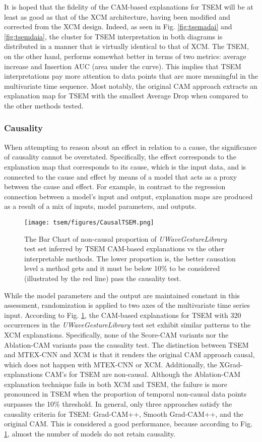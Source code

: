 \documentclass{svproc}
\begin{document}
It is hoped that the fidelity of the CAM-based explanations for TSEM will be at least as good as that of the XCM architecture, having been modified and corrected from the XCM design. Indeed, as seen in Fig. \ref{fig:tsemadai} and \ref{fig:tsemdaia}, the cluster for TSEM interpretation in both diagrams is distributed in a manner that is virtually identical to that of XCM. The TSEM, on the other hand, performs somewhat better in terms of two metrics: average increase and Insertion AUC (area under the curve). This implies that TSEM interpretations pay more attention to data points that are more meaningful in the multivariate time sequence. Most notably, the original CAM approach extracts an explanation map for TSEM with the smallest Average Drop when compared to the other methods tested.

\subsubsection{Causality}

When attempting to reason about an effect in relation to a cause, the significance of causality cannot be overstated. Specifically, the effect corresponds to the explanation map that corresponds to its cause, which is the input data, and is connected to the cause and effect by means of a model that acts as a proxy between the cause and effect. For example, in contrast to the regression connection between a model's input and output, explanation maps are produced as a result of a mix of inputs, model parameters, and outputs.
\begin{figure}[h!]
\centering
\texttt{[image: tsem/figures/CausalTSEM.png]}
\caption{The Bar Chart of non-causal proportion of \textit{UWaveGestureLibrary} test set inferred by TSEM CAM-based explanations vs the other interpretable methods. The lower proportion is, the better causation level a method gets and it must be below 10\% to be considered (illustrated by the red line) pass the causality test.}
\label{fig:causality}
\end{figure}

While the model parameters and the output are maintained constant in this assessment, randomization is applied to two axes of the multivariate time series input. According to Fig. \ref{fig:causality}, the CAM-based explanations for TSEM with 320 occurrences in the \textit{UWaveGestureLibrary} test set exhibit similar patterns to the XCM explanations. Specifically, none of the Score-CAM variants nor the Ablation-CAM variants pass the causality test. The distinction between TSEM and MTEX-CNN and XCM is that it renders the original CAM approach causal, which does not happen with MTEX-CNN or XCM. Additionally, the XGrad-explanations CAM's for TSEM are non-causal. Although the Ablation-CAM explanation technique fails in both XCM and TSEM, the failure is more pronounced in TSEM when the proportion of temporal non-causal data points surpasses the 10\% threshold. In general, only three approaches satisfy the causality criteria for TSEM: Grad-CAM++, Smooth Grad-CAM++, and the original CAM. This is considered a good performance, because according to Fig. \ref{fig:causality}, almost  the number of models do not retain causality. 
\end{document}

